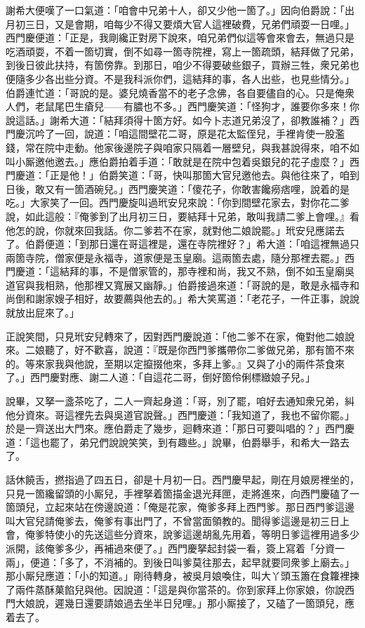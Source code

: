 謝希大便嘆了一口氣道：「咱會中兄弟十人，卻又少他一箇了。」因向伯爵說：「出月初三日，又是會期，咱每少不得又要煩大官人這裡破費，兄弟們頑耍一日哩。」西門慶便道：「正是，我剛纔正對房下說來，咱兄弟們似這等會來會去，無過只是吃酒頑耍，不着一箇切實，倒不如尋一箇寺院裡，寫上一箇疏頭，結拜做了兄弟，到後日彼此扶持，有箇傍靠。到那日，咱少不得要破些銀子，買辦三牲，衆兄弟也便隨多少各出些分資。不是我科派你們，這結拜的事，各人出些，也見些情分。」伯爵連忙道：「哥說的是。婆兒燒香當不的老子念佛，各自要儘自的心。只是俺衆人們，老鼠尾巴生瘡兒——有膿也不多。」西門慶笑道：「怪狗才，誰要你多來！你說這話。」謝希大道：「結拜須得十箇方好。如今卜志道兄弟沒了，卻教誰補？」西門慶沉吟了一回，說道：「咱這間壁花二哥，原是花太監侄兒，手裡肯使一股濫錢，常在院中走動。他家後邊院子與咱家只隔着一層壁兒，{}與我甚說得來，咱不如叫小厮邀他邀去。」應伯爵拍着手道：「敢就是在院中包着吳銀兒的花子虛麼？」西門慶道：「正是他！」伯爵笑道：「哥，快叫那箇大官兒邀他去。{}與他往來了，咱到日後，敢又有一箇酒碗兒。」西門慶笑道：「傻花子，你敢害饞癆痞哩，說着的是吃。」大家笑了一回。西門慶旋叫過玳安兒來說：「你到間壁花家去，對你花二爹說，如此這般：『俺爹到了出月初三日，要結拜十兄弟，敢叫我請二爹上會哩。』看他怎的說，你就來回我話。你二爹若不在家，就對他二娘說罷。」玳安兒應諾去了。伯爵便道：「到那日還在哥這裡是，還在寺院裡好？」希大道：「咱這裡無過只兩箇寺院，僧家便是永福寺，道家便是玉皇廟。{}這兩箇去處，隨分那裡去罷。」西門慶道：「這結拜的事，不是僧家管的，那寺裡和尚，我又不熟，倒不如玉皇廟吳道官與我相熟，他那裡又寬展又幽靜。」伯爵接過來道：「哥說的是，敢是永福寺和尚倒和謝家嫂子相好，故要薦與他去的。」希大笑罵道：「老花子，一件正事，說說就放出屁來了。」

正說笑間，只見玳安兒轉來了，因對西門慶說道：「他二爹不在家，俺對他二娘說來。二娘聽了，好不歡喜，{}說道：『既是你西門爹攜帶你二爹做兄弟，那有箇不來的。{}等來家我與他說，至期以定攛掇他來，多拜上爹。』又與了小的兩件茶食來了。」{}西門慶對應、謝二人道：「自這花二哥，倒好箇伶俐標緻娘子兒。」{}

說畢，又拏一盞茶吃了，二人一齊起身道：「哥，別了罷，咱好去通知衆兄弟，糾他分資來。哥這裡先去與吳道官說聲。」西門慶道：「我知道了，我也不留你罷。」於是一齊送出大門來。應伯爵走了幾步，迴轉來道：「那日可要叫唱的？」西門慶道：「這也罷了，弟兄們說說笑笑，到有趣些。」說畢，伯爵舉手，和希大一路去了。

話休饒舌，撚指過了四五日，卻是十月初一日。西門慶早起，剛在月娘房裡坐的，只見一箇纔留頭的小厮兒，手裡拏着箇描金退光拜匣，走將進來，向西門慶磕了一箇頭兒，立起來站在傍邊說道：「俺是花家，俺爹多拜上西門爹。那日西門爹這邊叫大官兒請俺爹去，俺爹有事出門了，不曾當面領教的。聞得爹這邊是初三日上會，俺爹特使小的先送這些分資來，說爹這邊胡亂先用着，等明日爹這裡用過多少派開，該俺爹多少，再補過來便了。」西門慶拏起封袋一看，簽上寫着「分資一兩」，便道：「多了，不消補的。到後日叫爹莫往那去，起早就要同衆爹上廟去。」那小厮兒應道：「小的知道。」剛待轉身，被吳月娘喚住，{}叫大丫頭玉簫在食籮裡揀了兩件蒸酥菓餡兒與他。因說道：「這是與你當茶的。你到家拜上你家娘，{}你說西門大娘說，遲幾日還要請娘過去坐半日兒哩。」那小厮接了，又磕了一箇頭兒，應着去了。

